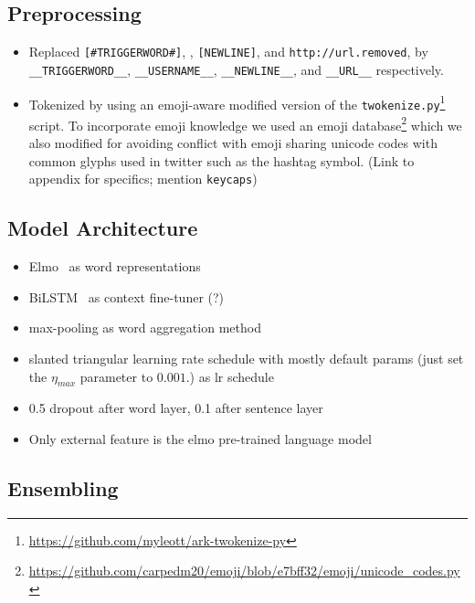 \documentclass[11pt,a4paper]{article}
\begin{document}
\subsection{Preprocessing}
\begin{itemize}
    \item Replaced \texttt{\footnotesize[\#TRIGGERWORD\#]}, \texttt{\footnotesize@USERNAME},
        \texttt{\footnotesize[NEWLINE]}, and \texttt{\footnotesize http://url.removed}, by
        \texttt{\footnotesize\_\_TRIGGERWORD\_\_}, \texttt{\footnotesize\_\_USERNAME\_\_},
        \texttt{\footnotesize\_\_NEWLINE\_\_}, and \texttt{\footnotesize\_\_URL\_\_} respectively.
    \item Tokenized by using an emoji-aware modified version of the
        \texttt{twokenize.py}\footnote{\tiny\url{https://github.com/myleott/ark-twokenize-py}}
        script. To incorporate emoji knowledge we used an emoji
        database\footnote{\tiny\url{https://github.com/carpedm20/emoji/blob/e7bff32/emoji/unicode_codes.py}}
        which we also modified for avoiding conflict with emoji sharing unicode
        codes with common glyphs used in twitter such as the hashtag symbol.
        (Link to appendix for specifics; mention \texttt{keycaps})
\end{itemize}


\subsection{Model Architecture}

\begin{itemize}
    \item Elmo~\cite{peters2018deep} as word representations
    \item BiLSTM~\cite{graves2005framewise, graves2013speech} as context fine-tuner (?)
    \item max-pooling as word aggregation method
    \item slanted triangular learning rate schedule with mostly default params
        (just set the $\eta_{max}$ parameter to $0.001$.)
        as lr schedule~\cite{howard2018universal}
    \item 0.5 dropout after word layer, 0.1 after sentence layer~\cite{srivastava2014dropout}
    \item Only external feature is the elmo pre-trained language model
\end{itemize}

\subsection{Ensembling}
\end{document}
